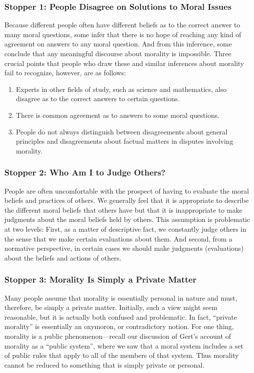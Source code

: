 \documentclass[12pt]{article}
\theoremstyle{definition}
\begin{document}
\subsubsection{Stopper 1: People Disagree on Solutions to Moral Issues}
Because different people often have different beliefs as to the correct answer to many
moral questions, some infer that there is no hope of reaching any kind of agreement on
answers to any moral question. And from this inference, some conclude that any
meaningful discourse about morality is impossible. Three crucial points that people
who draw these and similar inferences about morality fail to recognize, however, are as
follows:
\begin{enumerate}
\item Experts in other fields of study, such as science and mathematics, also disagree
as to the correct answers to certain questions.
\item There is common agreement as to answers to some moral questions.
\item People do not always distinguish between disagreements about general principles
and disagreements about factual matters in disputes involving morality.
\end{enumerate}
\subsubsection{Stopper 2: Who Am I to Judge Others?}
People are often uncomfortable with the prospect of having to evaluate the moral
beliefs and practices of others. We generally feel that it is appropriate to describe the
different moral beliefs that others have but that it is inappropriate to make judgments
about the moral beliefs held by others. This assumption is problematic at two levels: First,
as a matter of descriptive fact, we constantly judge others in the sense that we make
certain evaluations about them. And second, from a normative perspective, in certain
cases we should make judgments (evaluations) about the beliefs and actions of others.
\subsubsection{Stopper 3: Morality Is Simply a Private Matter}
Many people assume that morality is essentially personal in nature and must, therefore,
be simply a private matter. Initially, such a view might seem reasonable, but it is actually
both confused and problematic. In fact, “private morality” is essentially an oxymoron, or
contradictory notion. For one thing, morality is a public phenomenon—recall our
discussion of Gert’s account of morality as a “public system”, where
we saw that a moral system includes a set of public rules that apply to all of the members
of that system. Thus morality cannot be reduced to something that is simply private or
personal.
\end{document}
